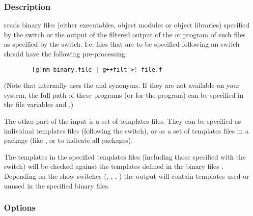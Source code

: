 \subsubsection*{Description}

 reads binary files (either executables, object modules or object
libraries) specified by the  switch or the output of the
 filtered output of the  or  
program of such files as specified by the  switch. I.e. files that
are to be specified following an  switch should have the following
pre-processing: 
\begin{verbatim}
        [g]nm binary.file | g++filt >! file.f
\end{verbatim}
(Note that internally  uses the  and 
synonyms. If they are not available on your system, the full path of these
programs (or for the  program) can be specified in the 
file variables  and .)

The other part of the input is a set of templates files. They can be
specified as individual templates files (following the  switch), or as
a set of templates files in a package (like ,  or
 to indicate all packages).

The templates in the specified templates files (including those specified
with the  switch) will be checked against the
templates defined in the binary files . Depending on the show switches (, ,
, ) the output will contain templates used or unused in
the specified binary files.

\subsubsection*{Options}

